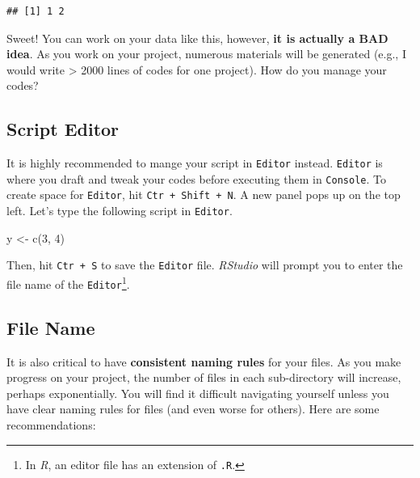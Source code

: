 \documentclass[
]{book}
\newenvironment{Shaded}{\begin{snugshade}}{\end{snugshade}}
\newcommand{\DecValTok}[1]{\textcolor[rgb]{0.00,0.00,0.81}{#1}}
\newcommand{\FunctionTok}[1]{\textcolor[rgb]{0.00,0.00,0.00}{#1}}
\newcommand{\NormalTok}[1]{#1}
\newcommand{\OtherTok}[1]{\textcolor[rgb]{0.56,0.35,0.01}{#1}}
\begin{document}
\begin{verbatim}
## [1] 1 2
\end{verbatim}

Sweet! You can work on your data like this, however, \textbf{it is actually a BAD idea}. As you work on your project, numerous materials will be generated (e.g., I would write \textgreater{} 2000 lines of codes for one project). How do you manage your codes?

\hypertarget{script-editor}{%
\subsection{Script Editor}\label{script-editor}}

It is highly recommended to mange your script in \texttt{Editor} instead. \texttt{Editor} is where you draft and tweak your codes before executing them in \texttt{Console}. To create space for \texttt{Editor}, hit \texttt{Ctr\ +\ Shift\ +\ N}. A new panel pops up on the top left. Let's type the following script in \texttt{Editor}.

\begin{Shaded}
\begin{Highlighting}[]
\NormalTok{y }\OtherTok{\textless{}{-}} \FunctionTok{c}\NormalTok{(}\DecValTok{3}\NormalTok{, }\DecValTok{4}\NormalTok{)}
\end{Highlighting}
\end{Shaded}

Then, hit \texttt{Ctr\ +\ S} to save the \texttt{Editor} file. \emph{RStudio} will prompt you to enter the file name of the \texttt{Editor}\footnote{In \emph{R}, an editor file has an extension of \texttt{.R}.}.

\hypertarget{file-name}{%
\subsection{File Name}\label{file-name}}

It is also critical to have \textbf{consistent naming rules} for your files. As you make progress on your project, the number of files in each sub-directory will increase, perhaps exponentially. You will find it difficult navigating yourself unless you have clear naming rules for files (and even worse for others). Here are some recommendations:
\end{document}
